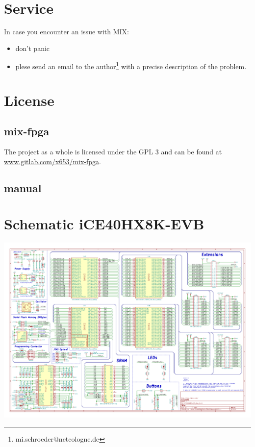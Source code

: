 \documentclass[a4paper,ngerman]{scrartcl}
\begin{document}
\section{Service}
In case you encounter an issue with MIX:
\begin{itemize}
	\item don't panic
	\item plese send an email to the author\footnote{mi.schroeder@netcologne.de} with a precise description of the problem.
\end{itemize}

\section{License}

\subsection{mix-fpga}
The project as a whole is licensed under the GPL 3 and can be found at \href{www.gitlab.com/x653/mix-fpga}{www.gitlab.com/x653/mix-fpga}.
\subsection{manual}
\doclicenseThis

\newpage

\appendix

\section{Schematic iCE40HX8K-EVB}
\label{sec:schematic}
\includegraphics[angle=90,scale=0.8]{iCE40HX8K-EVB.pdf}
\end{document}
